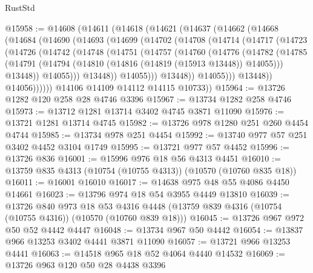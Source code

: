 \begin{lexlean}{RustStd}
\begin{coremodule}
@15958 := @14608
    (@14611
      (@14618
        (@14621
          (@14637
            (@14662
              (@14668
                (@14684
                  (@14690
                    (@14693
                      (@14699
                        (@14702
                          (@14708
                            (@14714
                              (@14717
                                (@14723
                                  (@14726
                                    (@14742
                                      (@14748
                                        (@14751
                                          (@14757
                                            (@14760
                                              (@14776
                                                (@14782
                                                  (@14785
                                                    (@14791
                                                      (@14794
                                                        (@14810
                                                          (@14816 (@14819 (@15913 @13448)) @14055)))
                                                      @13448))
                                                  @14055)))
                                            @13448))
                                        @14055)))
                                  @13448))
                              @14055)))
                        @13448))
                    @14056))))))
        @14106
        @14109
        @14112
        @14115
        @10733))
@15964 := @13726 @1282 @120 @258 @28 @4746 @3396
@15967 := @13734 @1282 @258 @4746
@15973 := @13712 @1281 @13714 @3402 @4745 @3871 @11090
@15976 := @13721 @1281 @13714 @4745
@15982 := @13726 @978 @1280 @251 @260 @4454 @4744
@15985 := @13734 @978 @251 @4454
@15992 := @13740 @977 @57 @251 @3402 @4452 @3104 @1749
@15995 := @13721 @977 @57 @4452
@15996 := @13726 @836
@16001 := @15996 @976 @18 @56 @4313 @4451
@16010 := @13759 @835 @4313 (@10754 (@10755 @4313)) (@10570 (@10760 @835 @18))
@16011 := @16001 @16010
@16017 := @14638 @975 @48 @55 @4086 @4450 @14661
@16023 := @13796 @974 @18 @54 @3955 @4449 @13810
@16039 := @13726
    @840
    @973
    @18
    @53
    @4316
    @4448
    (@13759 @839 @4316 (@10754 (@10755 @4316)) (@10570 (@10760 @839 @18)))
@16045 := @13726 @967 @972 @50 @52 @4442 @4447
@16048 := @13734 @967 @50 @4442
@16054 := @13837 @966 @13253 @3402 @4441 @3871 @11090
@16057 := @13721 @966 @13253 @4441
@16063 := @14518 @965 @18 @52 @4064 @4440 @14532
@16069 := @13726 @963 @120 @50 @28 @4438 @3396

\end{coremodule}
\end{lexlean}
